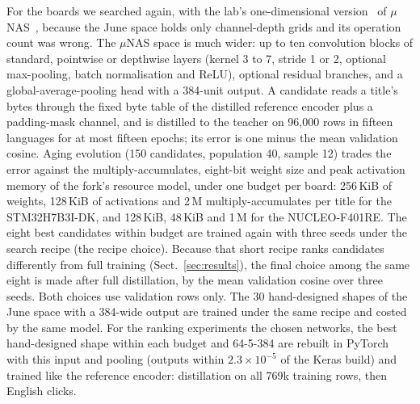 \documentclass{llncs}
\begin{document}
For the boards we searched again, with the lab's one-dimensional
version~\cite{capello2025unas1d} of $\mu$NAS~\cite{liberis2021unas}, because the
June space holds only channel-depth grids and its operation count was wrong. The
$\mu$NAS space is much wider: up to ten convolution blocks of standard, pointwise
or depthwise layers (kernel 3 to 7, stride 1 or 2, optional max-pooling, batch
normalisation and ReLU), optional residual branches, and a global-average-pooling
head with a 384-unit output. A candidate reads a title's bytes through the fixed
byte table of the distilled reference encoder plus a padding-mask channel, and is
distilled to the teacher on 96,000 rows in fifteen languages for at most fifteen
epochs; its error is one minus the mean validation cosine. Aging evolution (150
candidates, population 40, sample 12) trades the error against the
multiply-accumulates, eight-bit weight size and peak activation memory of the
fork's resource model, under one budget per board: 256\,KiB of weights, 128\,KiB
of activations and 2\,M multiply-accumulates per title for the STM32H7B3I-DK, and
128\,KiB, 48\,KiB and 1\,M for the NUCLEO-F401RE. The eight best candidates within
budget are trained again with three seeds under the search recipe (the recipe
choice). Because that short recipe ranks candidates differently from full
training (Sect.~\ref{sec:results}), the final choice among the same eight is made
after full distillation, by the mean validation cosine over three seeds. Both
choices use validation rows only. The 30 hand-designed shapes of the June space with a
384-wide output are trained under the same recipe and costed by the same model.
For the ranking experiments the chosen networks, the best hand-designed shape within
each budget and 64-5-384 are rebuilt in PyTorch with this input and pooling
(outputs within $2.3\times10^{-5}$ of the Keras build) and trained like the
reference encoder: distillation on all 769k training rows, then English clicks.
\end{document}
